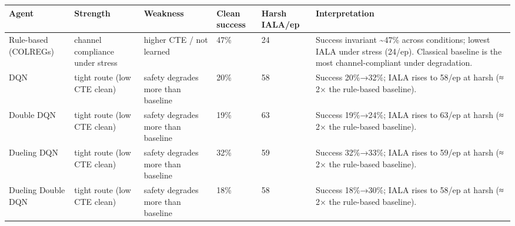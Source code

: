 \begin{tabular}{llllll}
\toprule
Agent & Strength & Weakness & Clean success & Harsh IALA/ep & Interpretation \\
\midrule
Rule-based (COLREGs) & channel compliance under stress & higher CTE / not learned & 47\% & 24 & Success invariant \textasciitilde 47\% across conditions; lowest IALA under stress (24/ep). Classical baseline is the most channel-compliant under degradation. \\
DQN & tight route (low CTE clean) & safety degrades more than baseline & 20\% & 58 & Success 20\%→32\%; IALA rises to 58/ep at harsh (≈ 2× the rule-based baseline). \\
Double DQN & tight route (low CTE clean) & safety degrades more than baseline & 19\% & 63 & Success 19\%→24\%; IALA rises to 63/ep at harsh (≈ 2× the rule-based baseline). \\
Dueling DQN & tight route (low CTE clean) & safety degrades more than baseline & 32\% & 59 & Success 32\%→33\%; IALA rises to 59/ep at harsh (≈ 2× the rule-based baseline). \\
Dueling Double DQN & tight route (low CTE clean) & safety degrades more than baseline & 18\% & 58 & Success 18\%→30\%; IALA rises to 58/ep at harsh (≈ 2× the rule-based baseline). \\
\bottomrule
\end{tabular}
